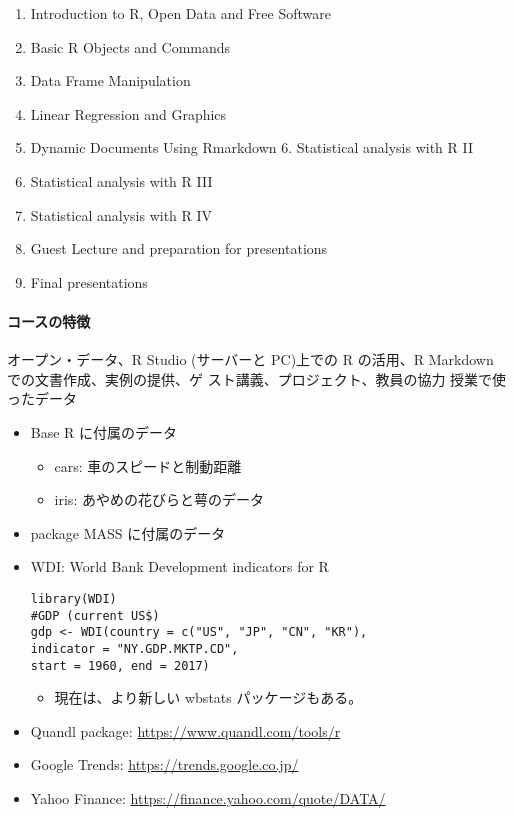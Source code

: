 \documentclass[
]{bxjsbook}
\providecommand{\tightlist}{%
  \setlength{\itemsep}{0pt}\setlength{\parskip}{0pt}}
\theoremstyle{definition}
\theoremstyle{definition}
\theoremstyle{definition}
\theoremstyle{definition}
\theoremstyle{remark}
\begin{document}
\begin{enumerate}
\def\labelenumi{\arabic{enumi}.}
\tightlist
\item
  Introduction to R, Open Data and Free Software
\item
  Basic R Objects and Commands
\item
  Data Frame Manipulation
\item
  Linear Regression and Graphics
\item
  Dynamic Documents Using Rmarkdown 6. Statistical analysis with R II
\item
  Statistical analysis with R III
\item
  Statistical analysis with R IV
\item
  Guest Lecture and preparation for presentations
\item
  Final presentations
\end{enumerate}

\hypertarget{ux30b3ux30fcux30b9ux306eux7279ux5fb4}{%
\paragraph{コースの特徴}\label{ux30b3ux30fcux30b9ux306eux7279ux5fb4}}

オープン・データ、R Studio (サーバーと PC)上での R の活用、R Markdown での文書作成、実例の提供、ゲ スト講義、プロジェクト、教員の協力
授業で使ったデータ

\begin{itemize}
\item
  Base R に付属のデータ

  \begin{itemize}
  \tightlist
  \item
    cars: 車のスピードと制動距離
  \item
    iris: あやめの花びらと萼のデータ
  \end{itemize}
\item
  package MASS に付属のデータ
\item
  WDI: World Bank Development indicators for R

\begin{verbatim}
library(WDI)
#GDP (current US$)
gdp <- WDI(country = c("US", "JP", "CN", "KR"),
indicator = "NY.GDP.MKTP.CD",
start = 1960, end = 2017)
\end{verbatim}

  \begin{itemize}
  \tightlist
  \item
    現在は、より新しい wbstats パッケージもある。
  \end{itemize}
\item
  Quandl package: \url{https://www.quandl.com/tools/r}
\item
  Google Trends: \url{https://trends.google.co.jp/}
\item
  Yahoo Finance: \url{https://finance.yahoo.com/quote/DATA/}
\end{itemize}
\end{document}
